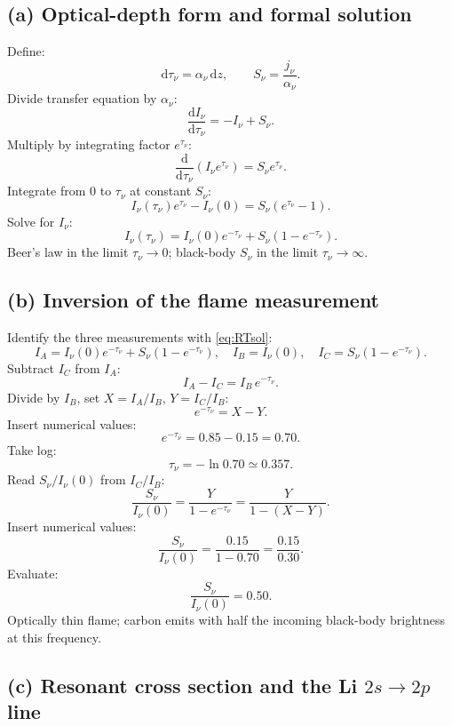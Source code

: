 \documentclass[11pt]{article}
\newcommand{\de}{\mathrm{d}}
\begin{document}
\subsection*{(a) Optical-depth form and formal solution}

Define:
\[
\de\tau_\nu=\alpha_\nu\,\de z,\qquad S_\nu=\frac{j_\nu}{\alpha_\nu}.
\]
Divide transfer equation by $\alpha_\nu$:
\[
\frac{\de I_\nu}{\de\tau_\nu}=-I_\nu+S_\nu.
\]
Multiply by integrating factor $e^{\tau_\nu}$:
\[
\frac{\de}{\de\tau_\nu}\!\left(I_\nu e^{\tau_\nu}\right)=S_\nu e^{\tau_\nu}.
\]
Integrate from $0$ to $\tau_\nu$ at constant $S_\nu$:
\[
I_\nu(\tau_\nu)e^{\tau_\nu}-I_\nu(0)=S_\nu(e^{\tau_\nu}-1).
\]
Solve for $I_\nu$:
\begin{equation}
\boxed{\;I_\nu(\tau_\nu)=I_\nu(0)e^{-\tau_\nu}+S_\nu(1-e^{-\tau_\nu}).\;}
\label{eq:RTsol}
\end{equation}
Beer's law in the limit $\tau_\nu\to 0$; black-body $S_\nu$ in the limit $\tau_\nu\to\infty$.

\subsection*{(b) Inversion of the flame measurement}

Identify the three measurements with \eqref{eq:RTsol}:
\[
I_A=I_\nu(0)e^{-\tau_\nu}+S_\nu(1-e^{-\tau_\nu}),\quad I_B=I_\nu(0),\quad I_C=S_\nu(1-e^{-\tau_\nu}).
\]
Subtract $I_C$ from $I_A$:
\[
I_A-I_C=I_B\,e^{-\tau_\nu}.
\]
Divide by $I_B$, set $X=I_A/I_B$, $Y=I_C/I_B$:
\[
e^{-\tau_\nu}=X-Y.
\]
Insert numerical values:
\[
e^{-\tau_\nu}=0.85-0.15=0.70.
\]
Take log:
\begin{equation}
\boxed{\;\tau_\nu=-\ln 0.70\simeq 0.357.\;}
\label{eq:tau-num}
\end{equation}
Read $S_\nu/I_\nu(0)$ from $I_C/I_B$:
\[
\frac{S_\nu}{I_\nu(0)}=\frac{Y}{1-e^{-\tau_\nu}}=\frac{Y}{1-(X-Y)}.
\]
Insert numerical values:
\[
\frac{S_\nu}{I_\nu(0)}=\frac{0.15}{1-0.70}=\frac{0.15}{0.30}.
\]
Evaluate:
\begin{equation}
\boxed{\;\frac{S_\nu}{I_\nu(0)}=0.50.\;}
\label{eq:S-num}
\end{equation}
Optically thin flame; carbon emits with half the incoming black-body brightness at this frequency.

\subsection*{(c) Resonant cross section and the Li $2s\to 2p$ line}
\end{document}
